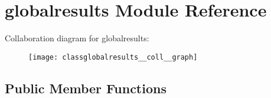 \hypertarget{classglobalresults}{\section{globalresults Module Reference}
\label{classglobalresults}
}


Collaboration diagram for globalresults\-:\nopagebreak
\begin{figure}[H]
\begin{center}
\leavevmode
\texttt{[image: classglobalresults\_\_coll\_\_graph]}
\end{center}
\end{figure}
\subsection*{Public Member Functions}
